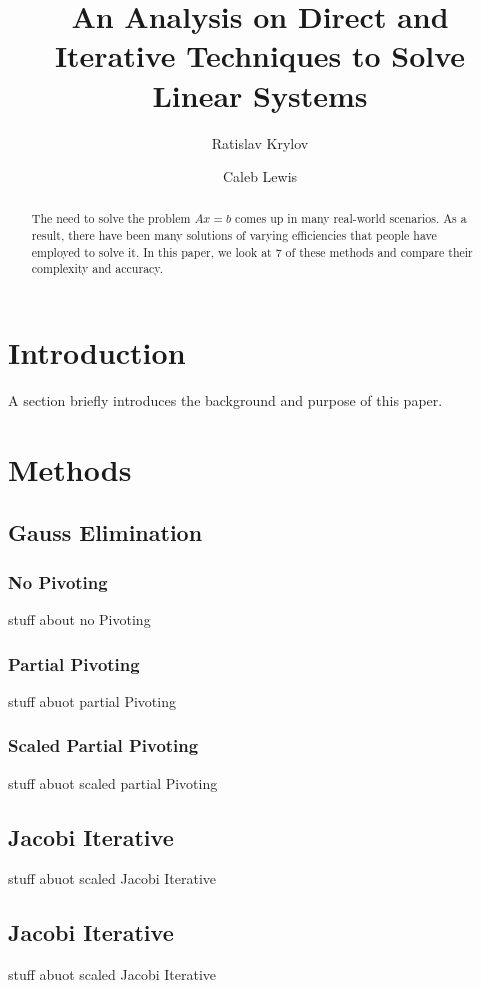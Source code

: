 \documentclass[11pt]{article}	%
\title{An Analysis on Direct and Iterative Techniques to Solve Linear Systems}
\author{Ratislav Krylov \and Caleb Lewis}
\begin{document}
\maketitle

\begin{abstract}
    The need to solve the problem $Ax = b$ comes up in many real-world scenarios.
    As a result, there have been many solutions of varying efficiencies that people
    have employed to solve it. In this paper, we look at 7 of these methods and
    compare their complexity and accuracy.
\end{abstract}

\section{Introduction}
A section briefly introduces the background and purpose of this paper.

\section{Methods}

\subsection{Gauss Elimination}

    \subsubsection{No Pivoting}
    stuff about no Pivoting

    \subsubsection{Partial Pivoting}
    stuff abuot partial Pivoting

    \subsubsection{Scaled Partial Pivoting}
    stuff abuot scaled partial Pivoting


\subsection{Jacobi Iterative}
stuff abuot scaled Jacobi Iterative

\subsection{Jacobi Iterative}
stuff abuot scaled Jacobi Iterative
\end{document}
